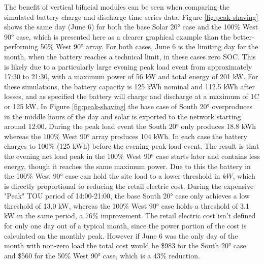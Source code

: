 \documentclass[journal,article,submit,pdftex,moreauthors]{Definitions/mdpi}
\begin{document}
The benefit of vertical bifacial modules can be seen when comparing the simulated battery charge and discharge time series data. Figure \ref{fig:peak-shaving} shows the same day (June 6) for both the base Solar 20° case and the 100\% West 90° case, which is presented here as a clearer graphical example than the better-performing 50\% West 90° array. For both cases, June 6 is the limiting day for the month, when the battery reaches a technical limit, in these cases zero SOC. This is likely due to a particularly large evening peak load event from approximately 17:30 to 21:30, with a maximum power of 56 kW and total energy of 201 kW. For these simulations, the battery capacity is 125 kWh nominal and 112.5 kWh after losses, and as specified the battery will charge and discharge at a maximum of 1C or 125 kW. In Figure \ref{fig:peak-shaving} the base case of South 20° overproduces in the middle hours of the day and solar is exported to the network starting around 12:00. During the peak load event the South 20° only produces 18.8 kWh whereas the 100\% West 90° array produces 104 kWh. In each case the battery charges to 100\% (125 kWh) before the evening peak load event. The result is that the evening net load peak in the 100\% West 90° case starts later and contains less energy, though it reaches the same maximum power. Due to this the battery in the 100\% West 90° case can hold the site load to a lower threshold in \(kW\), which is directly proportional to reducing the retail electric cost. During the expensive "Peak" TOU period of 14:00-21:00, the base South 20° case only achieves a low threshold of 13.0 kW, whereas the 100\% West 90° case holds a threshold of 3.1 kW in the same period, a 76\% improvement. The retail electric cost isn't defined for only one day out of a typical month, since the power portion of the cost is calculated on the monthly peak. However if June 6 was the only day of the month with non-zero load the total cost would be \$983 for the South 20° case and \$560 for the 50\% West 90° case, which is a 43\% reduction.
\end{document}
